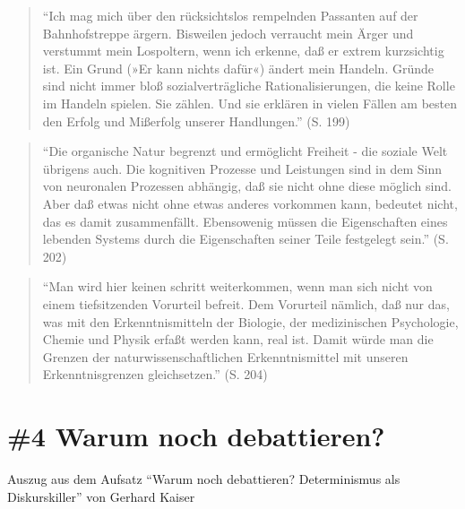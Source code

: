 \documentclass[
  a4paper,
]{report}
\begin{document}
\begin{quote}
``Ich mag mich über den rücksichtslos rempelnden Passanten auf der Bahnhofstreppe ärgern. Bisweilen jedoch verraucht mein Ärger und verstummt mein Lospoltern, wenn ich erkenne, daß er extrem kurzsichtig ist. Ein Grund (»Er kann nichts dafür«) ändert mein Handeln. Gründe sind nicht immer bloß sozialverträgliche Rationalisierungen, die keine Rolle im Handeln spielen. Sie zählen. Und sie erklären in vielen Fällen am besten den Erfolg und Mißerfolg unserer Handlungen.'' (S. 199)
\end{quote}

\begin{quote}
``Die organische Natur begrenzt und ermöglicht Freiheit - die soziale Welt übrigens auch. Die kognitiven Prozesse und Leistungen sind in dem Sinn von neuronalen Prozessen abhängig, daß sie nicht ohne diese möglich sind. Aber daß etwas nicht ohne etwas anderes vorkommen kann, bedeutet nicht, das es damit zusammenfällt. Ebensowenig müssen die Eigenschaften eines lebenden Systems durch die Eigenschaften seiner Teile festgelegt sein.'' (S. 202)
\end{quote}

\begin{quote}
``Man wird hier keinen schritt weiterkommen, wenn man sich nicht von einem tiefsitzenden Vorurteil befreit. Dem Vorurteil nämlich, daß nur das, was mit den Erkenntnismitteln der Biologie, der medizinischen Psychologie, Chemie und Physik erfaßt werden kann, real ist. Damit würde man die Grenzen der naturwissenschaftlichen Erkenntnismittel mit unseren Erkenntnisgrenzen gleichsetzen.'' (S. 204)
\end{quote}

\hypertarget{pr-ev4}{%
\section{\#4 Warum noch debattieren?}\label{pr-ev4}}

Auszug aus dem Aufsatz ``Warum noch debattieren? Determinismus als Diskurskiller'' von Gerhard Kaiser \citeyearpar{Kaiser2004}
\end{document}
